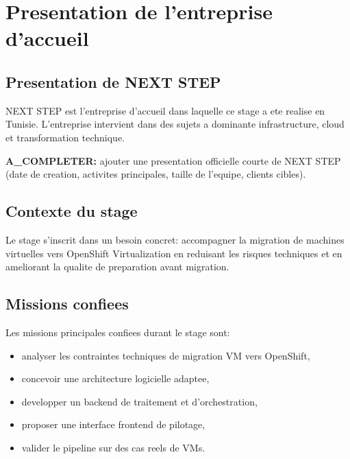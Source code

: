 ﻿\chapter{Presentation de l'entreprise d'accueil}

\section{Presentation de NEXT STEP}
NEXT STEP est l'entreprise d'accueil dans laquelle ce stage a ete realise en Tunisie. L'entreprise intervient dans des sujets a dominante infrastructure, cloud et transformation technique.

\textbf{A_COMPLETER:} ajouter une presentation officielle courte de NEXT STEP (date de creation, activites principales, taille de l'equipe, clients cibles).

\section{Contexte du stage}
Le stage s'inscrit dans un besoin concret: accompagner la migration de machines virtuelles vers OpenShift Virtualization en reduisant les risques techniques et en ameliorant la qualite de preparation avant migration.

\section{Missions confiees}
Les missions principales confiees durant le stage sont:
\begin{itemize}[leftmargin=1.2cm]
  \item analyser les contraintes techniques de migration VM vers OpenShift,
  \item concevoir une architecture logicielle adaptee,
  \item developper un backend de traitement et d'orchestration,
  \item proposer une interface frontend de pilotage,
  \item valider le pipeline sur des cas reels de VMs.
\end{itemize}
